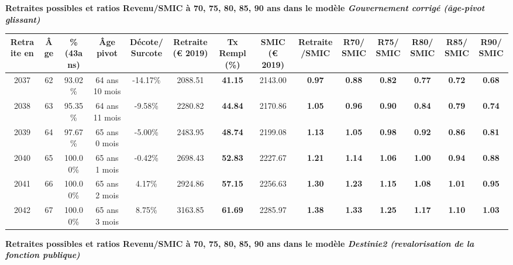  \vspace{0.1cm} 
{\bf \noindent Retraites possibles et ratios Revenu/SMIC à 70, 75, 80, 85, 90 ans dans le modèle \emph{Gouvernement corrigé (âge-pivot glissant)}}  
 
\begin{adjustbox}{max width=\textwidth} 
\begin{tabular}[htb]{|c|c||c|c|c||c|c||c|c||c|c|c|c|c|} 
\hline 
 Retraite en &  Âge &  \%(43ans) &  Âge pivot &  Décote/Surcote &  Retraite (\euro{} 2019) &  Tx Rempl(\%) &  SMIC (\euro{} 2019) &  Retraite/SMIC &  R70/SMIC &  R75/SMIC &  R80/SMIC &  R85/SMIC &  R90/SMIC \\ 
\hline \hline 
 2037 &  62 &  93.02\% &  64 ans 10 mois &  -14.17\% &  2088.51 &  {\bf 41.15} &  2143.00 &  {\bf {\color{red} 0.97}} &  {\bf {\color{red} 0.88}} &  {\bf {\color{red} 0.82}} &  {\bf {\color{red} 0.77}} &  {\bf {\color{red} 0.72}} &  {\bf {\color{red} 0.68}} \\ 
\hline 
 2038 &  63 &  95.35\% &  64 ans 11 mois &  -9.58\% &  2280.82 &  {\bf 44.84} &  2170.86 &  {\bf 1.05} &  {\bf {\color{red} 0.96}} &  {\bf {\color{red} 0.90}} &  {\bf {\color{red} 0.84}} &  {\bf {\color{red} 0.79}} &  {\bf {\color{red} 0.74}} \\ 
\hline 
 2039 &  64 &  97.67\% &  65 ans 0 mois &  -5.00\% &  2483.95 &  {\bf 48.74} &  2199.08 &  {\bf 1.13} &  {\bf 1.05} &  {\bf {\color{red} 0.98}} &  {\bf {\color{red} 0.92}} &  {\bf {\color{red} 0.86}} &  {\bf {\color{red} 0.81}} \\ 
\hline 
 2040 &  65 &  100.00\% &  65 ans 1 mois &  -0.42\% &  2698.43 &  {\bf 52.83} &  2227.67 &  {\bf 1.21} &  {\bf 1.14} &  {\bf 1.06} &  {\bf {\color{red} 1.00}} &  {\bf {\color{red} 0.94}} &  {\bf {\color{red} 0.88}} \\ 
\hline 
 2041 &  66 &  100.00\% &  65 ans 2 mois &  4.17\% &  2924.86 &  {\bf 57.15} &  2256.63 &  {\bf 1.30} &  {\bf 1.23} &  {\bf 1.15} &  {\bf 1.08} &  {\bf 1.01} &  {\bf {\color{red} 0.95}} \\ 
\hline 
 2042 &  67 &  100.00\% &  65 ans 3 mois &  8.75\% &  3163.85 &  {\bf 61.69} &  2285.97 &  {\bf 1.38} &  {\bf 1.33} &  {\bf 1.25} &  {\bf 1.17} &  {\bf 1.10} &  {\bf 1.03} \\ 
\hline 
\hline 
\end{tabular} 
\end{adjustbox} 
 
 \vspace{0.1cm} 
{\bf \noindent Retraites possibles et ratios Revenu/SMIC à 70, 75, 80, 85, 90 ans dans le modèle \emph{Destinie2 (revalorisation de la fonction publique)}}  
 
